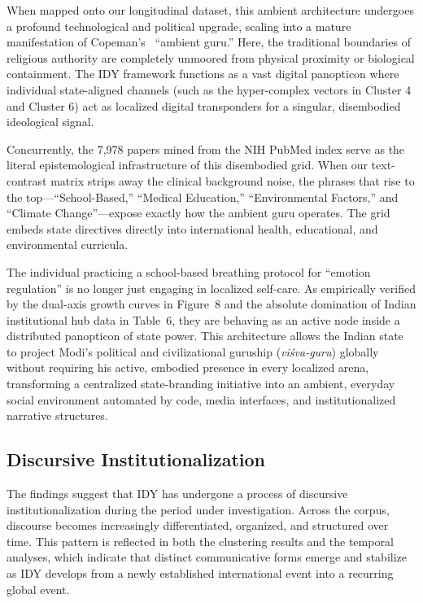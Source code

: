 \documentclass[11pt]{article}
\begin{document}
{When mapped onto our longitudinal dataset, this ambient architecture undergoes a profound technological and political upgrade, scaling into a mature manifestation of Copeman’s~\cite{copeman2012} ``ambient guru.'' Here, the traditional boundaries of religious authority are completely unmoored from physical proximity or biological containment. The IDY framework functions as a vast digital panopticon where individual state-aligned channels (such as the hyper-complex vectors in Cluster 4 and Cluster 6) act as localized digital transponders for a singular, disembodied ideological signal. 

Concurrently, the 7,978 papers mined from the NIH PubMed index serve as the literal epistemological infrastructure of this disembodied grid. When our text-contrast matrix strips away the clinical background noise, the phrases that rise to the top---``School-Based,'' ``Medical Education,'' ``Environmental Factors,'' and ``Climate Change''---expose exactly how the ambient guru operates. The grid embeds state directives directly into international health, educational, and environmental curricula. 

The individual practicing a school-based breathing protocol for ``emotion regulation'' is no longer just engaging in localized self-care. As empirically verified by the dual-axis growth curves in Figure~8 and the absolute domination of Indian institutional hub data in Table~6, they are behaving as an active node inside a distributed panopticon of state power. This architecture allows the Indian state to project Modi’s political and civilizational guruship (\textit{vi\'{s}va-guru}) globally without requiring his active, embodied presence in every localized arena, transforming a centralized state-branding initiative into an ambient, everyday social environment automated by code, media interfaces, and institutionalized narrative structures.

\subsection{Discursive Institutionalization}


The findings suggest that IDY has undergone a process of discursive institutionalization during the period under investigation. Across the corpus, discourse becomes increasingly differentiated, organized, and structured over time. This pattern is reflected in both the clustering results and the temporal analyses, which indicate that distinct communicative forms emerge and stabilize as IDY develops from a newly established international event into a recurring global event.

}
\end{document}
